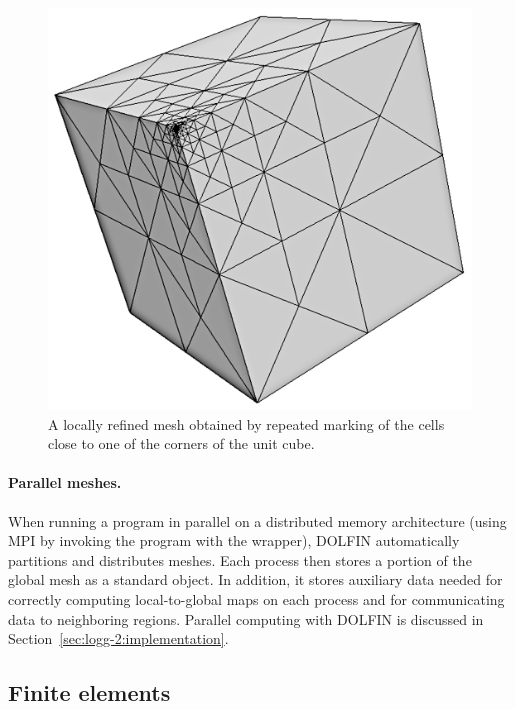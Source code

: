 \begin{figure}
  \centering
  \includegraphics[width=\smallfig]{chapters/logg-2/png/refined_cube.png}
  \caption{A locally refined mesh obtained by repeated marking of the
    cells close to one of the corners of the unit cube.}
  \label{fig:logg-2:refinement}
\end{figure}


\paragraph{Parallel meshes.}

When running a program in parallel on a distributed memory architecture
(using MPI by invoking the program with the  wrapper),
DOLFIN automatically partitions and distributes meshes. Each process
then stores a portion of the global mesh as a standard 
object. In addition, it stores auxiliary data needed for correctly
computing local-to-global maps on each process and for communicating
data to neighboring regions. Parallel computing with DOLFIN is discussed
in Section~\ref{sec:logg-2:implementation}.

\subsection{Finite elements}

